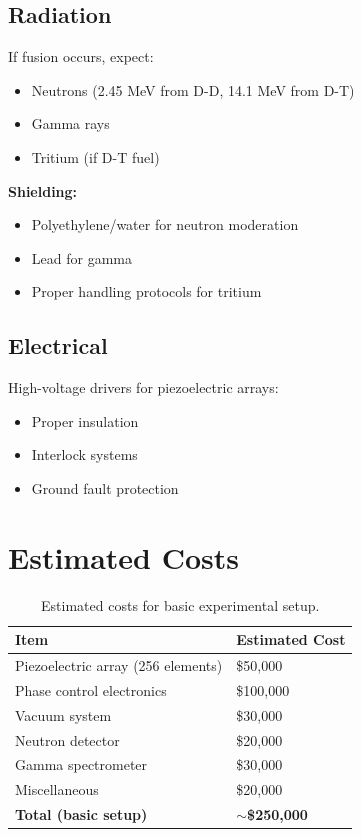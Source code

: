 \documentclass[12pt,a4paper]{article}
\begin{document}
\subsection{Radiation}

If fusion occurs, expect:
\begin{itemize}
    \item Neutrons (2.45 MeV from D-D, 14.1 MeV from D-T)
    \item Gamma rays
    \item Tritium (if D-T fuel)
\end{itemize}

\textbf{Shielding:}
\begin{itemize}
    \item Polyethylene/water for neutron moderation
    \item Lead for gamma
    \item Proper handling protocols for tritium
\end{itemize}

\subsection{Electrical}

High-voltage drivers for piezoelectric arrays:
\begin{itemize}
    \item Proper insulation
    \item Interlock systems
    \item Ground fault protection
\end{itemize}

\section{Estimated Costs}

\begin{table}[H]
\centering
\begin{tabular}{@{}ll@{}}
\toprule
\textbf{Item} & \textbf{Estimated Cost} \\
\midrule
Piezoelectric array (256 elements) & \$50,000 \\
Phase control electronics & \$100,000 \\
Vacuum system & \$30,000 \\
Neutron detector & \$20,000 \\
Gamma spectrometer & \$30,000 \\
Miscellaneous & \$20,000 \\
\midrule
\textbf{Total (basic setup)} & \textbf{$\sim$\$250,000} \\
\bottomrule
\end{tabular}
\caption{Estimated costs for basic experimental setup.}
\end{table}
\end{document}
